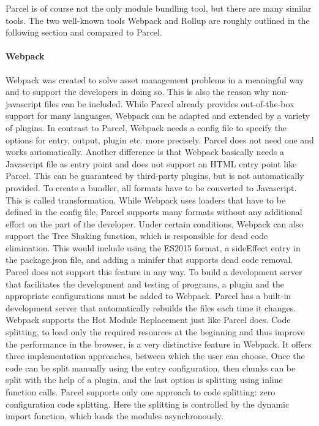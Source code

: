 Parcel is of course not the only module bundling tool, but there are many similar tools. The two well-known tools Webpack and Rollup are roughly outlined in the following section and compared to Parcel.

\paragraph{Webpack}
\label{par:tecWebpack}
Webpack was created to solve asset management problems in a meaningful way and to support the developers in doing so. This is also the reason why non-javascript files can be included. While Parcel already provides out-of-the-box support for many languages, Webpack can be adapted and extended by a variety of plugins. In contrast to Parcel, Webpack needs a config file to specify the options for entry, output, plugin etc. more precisely. Parcel does not need one and works automatically. Another difference is that Webpack basically needs a Javascript file as entry point and does not support an HTML entry point like Parcel. This can be guaranteed by third-party plugins, but is not automatically provided. To create a bundler, all formats have to be converted to Javascript. This is called transformation. While Webpack uses loaders that have to be defined in the config file, Parcel supports many formats without any additional effort on the part of the developer. Under certain conditions, Webpack can also support the Tree Shaking function, which is responsible for dead code elimination. This would include using the ES2015 format, a sideEffect entry in the package.json file, and adding a minifer that supports dead code removal. Parcel does not support this feature in any way. To build a development server that facilitates the development and testing of programs, a plugin and the appropriate configurations must be added to Webpack. Parcel has a built-in development server that automatically rebuilds the files each time it changes. Webpack supports the Hot Module Replacement just like Parcel does. Code splitting, to load only the required resources at the beginning and thus improve the performance in the browser, is a very distinctive feature in Webpack. It offers three implementation approaches, between which the user can choose. Once the code can be split manually using the entry configuration, then chunks can be split with the help of a plugin, and the last option is splitting using inline function calls. Parcel supports only one approach to code splitting: zero configuration code splitting. Here the splitting is controlled by the dynamic import function, which loads the modules asynchronously.

